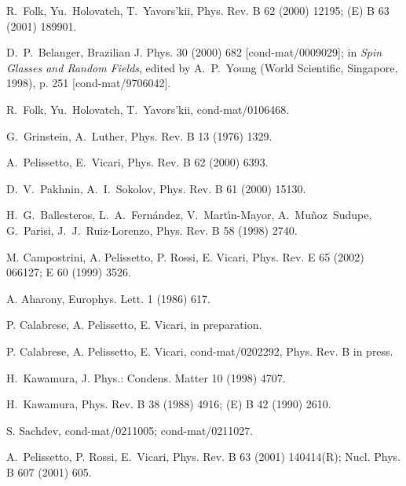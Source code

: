 \documentclass[a4paper,12pt]{article}
\begin{document}
\begin{thebibliography}{99}
R.~Folk, Yu.~Holovatch, T.~Yavors'kii,
Phys. Rev. B  62 (2000) 12195; 
(E) B  63 (2001) 189901.

D.~P.~Belanger, 
Brazilian J. Phys.  30  (2000)  682
[cond-mat/0009029];
in {\em Spin Glasses and Random Fields}, edited
by A.~P.~Young (World Scientific, Singapore, 1998), p. 251
[cond-mat/9706042].

R.~Folk, Yu.~Holovatch, T.~Yavors'kii, cond-mat/0106468.

G.~Grinstein, A.~Luther,
Phys. Rev. B  13  (1976) 1329.

A.~Pelissetto, E.~Vicari, Phys. Rev. B  62  (2000) 6393.

D.~V.~Pakhnin, A.~I.~Sokolov,
Phys. Rev. B  61   (2000) 15130.

H.~G.~Ballesteros, L.~A.~Fern\'andez, V.~Mart\'{\i}n-Mayor, A.~Mu\~noz~Sudupe,
G.~Parisi, J.~J.~Ruiz-Lorenzo,
Phys. Rev. B  58  (1998) 2740.

M. Campostrini, A. Pelissetto, P. Rossi, E. Vicari,
Phys. Rev. E 65 (2002) 066127;
E  60  (1999) 3526.


A. Aharony, Europhys. Lett. 1 (1986) 617.

P. Calabrese, A. Pelissetto, E. Vicari, in preparation.

P. Calabrese, A. Pelissetto, E. Vicari,
cond-mat/0202292, Phys. Rev. B in press.

H.~Kawamura, J. Phys.: Condens. Matter  10  (1998) 4707.

H.~Kawamura, Phys. Rev. B  38  (1988) 4916;
(E)  B  42  (1990) 2610.

S. Sachdev, cond-mat/0211005; cond-mat/0211027.

A.~Pelissetto, P. Rossi, E.~Vicari,
Phys. Rev. B  63 (2001) 140414(R);
Nucl. Phys. B  607 (2001) 605.


\end{thebibliography}
\end{document}
